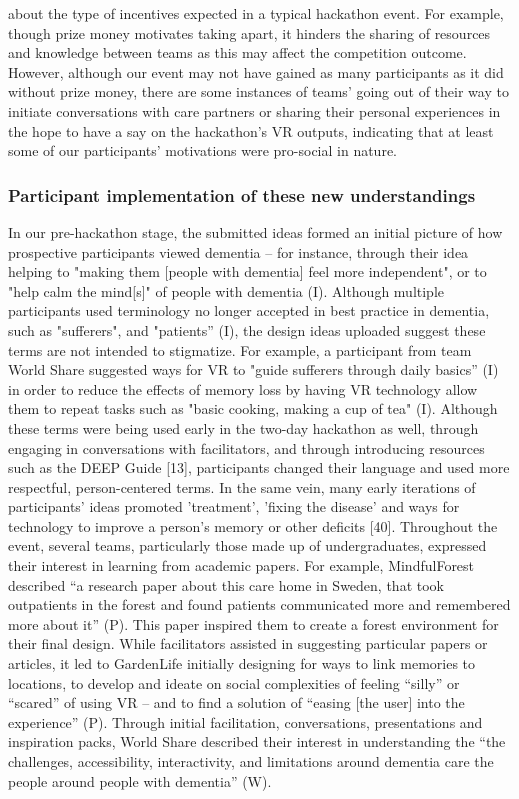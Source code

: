 about the type of incentives expected in a typical hackathon event. For example, though prize money motivates taking apart, it hinders the sharing of resources and knowledge between teams as this may affect the competition outcome. However, although our event may not have gained as many participants as it did without prize money, there are some instances of teams’ going out of their way to initiate conversations with care partners or sharing their personal experiences in the hope to have a say on the hackathon’s VR outputs, indicating that at least some of our participants’ motivations were pro-social in nature.

\subsubsection{Participant implementation of these new understandings}
\label{ThemeOne:subthemeTwo}
In our pre-hackathon stage, the submitted ideas formed an initial picture of how prospective participants viewed dementia – for instance, through their idea helping to "making them [people with dementia] feel more independent", or to "help calm the mind[s]" of people with dementia (I). Although multiple participants used terminology no longer accepted in best practice in dementia, such as "sufferers", and "patients'' (I), the design ideas uploaded suggest these terms are not intended to stigmatize. For example, a participant from team World Share suggested ways for VR to "guide sufferers through daily basics'' (I) in order to reduce the effects of memory loss by having VR technology allow them to repeat tasks such as "basic cooking, making a cup of tea" (I). Although these terms were being used early in the two-day hackathon as well, through engaging in conversations with facilitators, and through introducing resources such as the DEEP Guide  [13],  participants changed their language and used more respectful, person-centered terms. In the same vein, many early iterations of participants’ ideas promoted 'treatment', 'fixing the disease' and ways for technology to improve a person's memory or other deficits [40]. Throughout the event, several teams, particularly those made up of undergraduates, expressed their interest in learning from academic papers. For example, MindfulForest described “a research paper about this care home in Sweden, that took outpatients in the forest and found patients communicated more and remembered more about it” (P). This paper inspired them to create a forest environment for their final design. While facilitators assisted in suggesting particular papers or articles, it led to GardenLife initially designing for ways to link memories to locations, to develop and ideate on social complexities of feeling “silly” or “scared” of using VR – and to find a solution of “easing [the user] into the experience” (P). Through initial facilitation, conversations, presentations and inspiration packs, World Share described their interest in understanding the “the challenges, accessibility, interactivity, and limitations around dementia care the people around people with dementia” (W).
